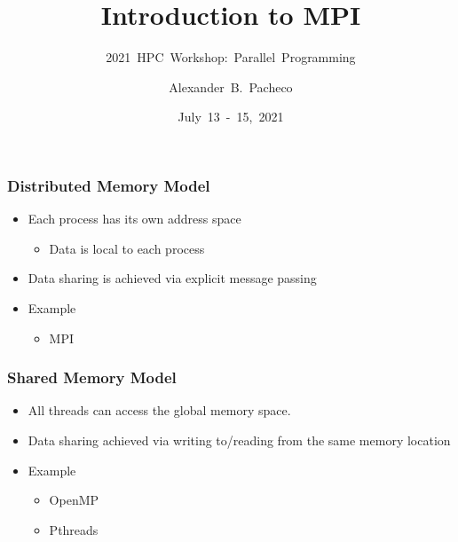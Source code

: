 \documentclass[9pt,c]{beamer}
\title{Introduction to MPI}
\subtitle{2021~HPC~Workshop:~Parallel~Programming}
\author{\large{Alexander~B.~Pacheco}}
\institute[Lehigh University Research Computing]{\href{http://researchcomputing.lehigh.edu}{Research~Computing}}
\date{July~13~-~15,~2021}
\begin{document}
\begin{frame}
  \titlepage
\end{frame}

\begin{frame}
  \frametitle{Distributed Memory Model}
    \begin{itemize}
      \item Each process has its own address space
      \begin{itemize}
        \item Data is local to each process
      \end{itemize}
      \item Data sharing is achieved via explicit message passing
      \item Example
      \begin{itemize}
        \item MPI
      \end{itemize}
    \end{itemize}

    
\end{frame}

\begin{frame}
  \frametitle{Shared Memory Model}
    \begin{itemize}
      \item All threads can access the global memory space.
      \item Data sharing achieved via writing to/reading from the same memory location
      \item Example
      \begin{itemize}
        \item OpenMP
        \item Pthreads
      \end{itemize}
    \end{itemize}
    
\end{frame}
\end{document}
